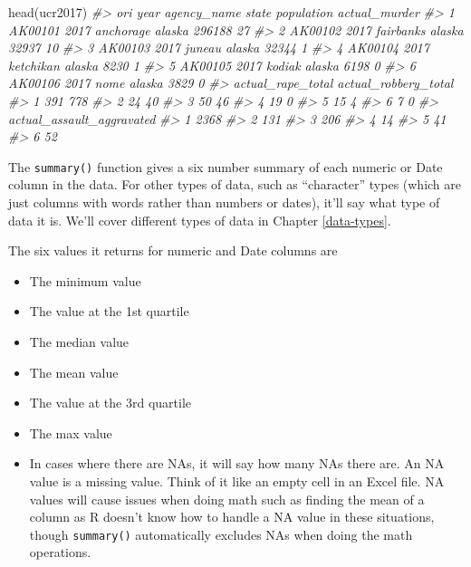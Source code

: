 \documentclass[
]{krantz}
\makeatletter
\newenvironment{Shaded}{\begin{snugshade}}{\end{snugshade}}
\newcommand{\CommentTok}[1]{\textcolor[rgb]{0.37,0.37,0.37}{\textit{#1}}}
\newcommand{\FunctionTok}[1]{\textcolor[rgb]{0,0,0}{#1}}
\newcommand{\NormalTok}[1]{#1}
\providecommand{\tightlist}{%
  \setlength{\itemsep}{0pt}\setlength{\parskip}{0pt}}
\newenvironment{kframe}{%
\medskip{}
\setlength{\fboxsep}{.8em}
 \def\at@end@of@kframe{}%
 \ifinner\ifhmode%
  \def\at@end@of@kframe{\end{minipage}}%
  \begin{minipage}{\columnwidth}%
 \fi\fi%
 \def\FrameCommand##1{\hskip\@totalleftmargin \hskip-\fboxsep
 \colorbox{shadecolor}{##1}\hskip-\fboxsep
     \hskip-\linewidth \hskip-\@totalleftmargin \hskip\columnwidth}%
 \MakeFramed {\advance\hsize-\width
   \@totalleftmargin\z@ \linewidth\hsize
   \@setminipage}}%
 {\par\unskip\endMakeFramed%
 \at@end@of@kframe}
\renewenvironment{Shaded}{\begin{kframe}}{\end{kframe}}
\makeatother
\begin{document}
\begin{Shaded}
\begin{Highlighting}[]
\FunctionTok{head}\NormalTok{(ucr2017)}
\CommentTok{\#\textgreater{}       ori year agency\_name  state population actual\_murder}
\CommentTok{\#\textgreater{} 1 AK00101 2017   anchorage alaska     296188            27}
\CommentTok{\#\textgreater{} 2 AK00102 2017   fairbanks alaska      32937            10}
\CommentTok{\#\textgreater{} 3 AK00103 2017      juneau alaska      32344             1}
\CommentTok{\#\textgreater{} 4 AK00104 2017   ketchikan alaska       8230             1}
\CommentTok{\#\textgreater{} 5 AK00105 2017      kodiak alaska       6198             0}
\CommentTok{\#\textgreater{} 6 AK00106 2017        nome alaska       3829             0}
\CommentTok{\#\textgreater{}   actual\_rape\_total actual\_robbery\_total}
\CommentTok{\#\textgreater{} 1               391                  778}
\CommentTok{\#\textgreater{} 2                24                   40}
\CommentTok{\#\textgreater{} 3                50                   46}
\CommentTok{\#\textgreater{} 4                19                    0}
\CommentTok{\#\textgreater{} 5                15                    4}
\CommentTok{\#\textgreater{} 6                 7                    0}
\CommentTok{\#\textgreater{}   actual\_assault\_aggravated}
\CommentTok{\#\textgreater{} 1                      2368}
\CommentTok{\#\textgreater{} 2                       131}
\CommentTok{\#\textgreater{} 3                       206}
\CommentTok{\#\textgreater{} 4                        14}
\CommentTok{\#\textgreater{} 5                        41}
\CommentTok{\#\textgreater{} 6                        52}
\end{Highlighting}
\end{Shaded}

The \texttt{summary()} function gives a six number summary
of each numeric or Date column in the data. For other types
of data, such as ``character'' types (which are just columns
with words rather than numbers or dates), it'll say what
type of data it is. We'll cover different types of data in
Chapter \ref{data-types}.

The six values it returns for numeric and Date columns are

\begin{itemize}
\tightlist
\item
  The minimum value
\item
  The value at the 1st quartile
\item
  The median value
\item
  The mean value
\item
  The value at the 3rd quartile
\item
  The max value
\item
  In cases where there are NAs, it will say how many NAs
  there are. An NA value is a missing value. Think of it
  like an empty cell in an Excel file. NA values will cause
  issues when doing math such as finding the mean of a
  column as R doesn't know how to handle a NA value in these
  situations, though \texttt{summary()} automatically
  excludes NAs when doing the math operations.
\end{itemize}
\end{document}
